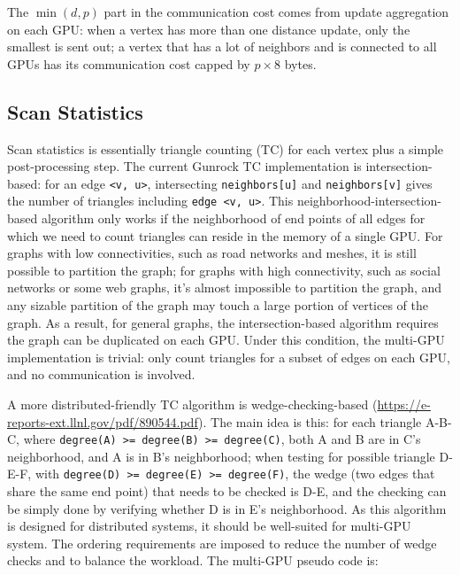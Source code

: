 \documentclass[10pt,oneside]{memoir}
\begin{document}
The \(\min(d, p)\) part in the communication cost comes from update
aggregation on each GPU: when a vertex has more than one distance
update, only the smallest is sent out; a vertex that has a lot of
neighbors and is connected to all GPUs has its communication cost capped
by \(p \times 8\) bytes.

\hypertarget{scan-statistics}{%
\subsection{Scan Statistics}\label{scan-statistics}}

Scan statistics is essentially triangle counting (TC) for each vertex
plus a simple post-processing step. The current Gunrock TC
implementation is intersection-based: for an edge
\texttt{\textless{}v,\ u\textgreater{}}, intersecting
\texttt{neighbors{[}u{]}} and \texttt{neighbors{[}v{]}} gives the number
of triangles including \texttt{edge\ \textless{}v,\ u\textgreater{}}.
This neighborhood-intersection-based algorithm only works if the
neighborhood of end points of all edges for which we need to count
triangles can reside in the memory of a single GPU. For graphs with low
connectivities, such as road networks and meshes, it is still possible
to partition the graph; for graphs with high connectivity, such as
social networks or some web graphs, it's almost impossible to partition
the graph, and any sizable partition of the graph may touch a large
portion of vertices of the graph. As a result, for general graphs, the
intersection-based algorithm requires the graph can be duplicated on
each GPU. Under this condition, the multi-GPU implementation is trivial:
only count triangles for a subset of edges on each GPU, and no
communication is involved.

A more distributed-friendly TC algorithm is wedge-checking-based
(\url{https://e-reports-ext.llnl.gov/pdf/890544.pdf}). The main idea is
this: for each triangle A-B-C, where
\texttt{degree(A)\ \textgreater{}=\ degree(B)\ \textgreater{}=\ degree(C)},
both A and B are in C's neighborhood, and A is in B's neighborhood; when
testing for possible triangle D-E-F, with
\texttt{degree(D)\ \textgreater{}=\ degree(E)\ \textgreater{}=\ degree(F)},
the wedge (two edges that share the same end point) that needs to be
checked is D-E, and the checking can be simply done by verifying whether
D is in E's neighborhood. As this algorithm is designed for distributed
systems, it should be well-suited for multi-GPU system. The ordering
requirements are imposed to reduce the number of wedge checks and to
balance the workload. The multi-GPU pseudo code is:
\end{document}
